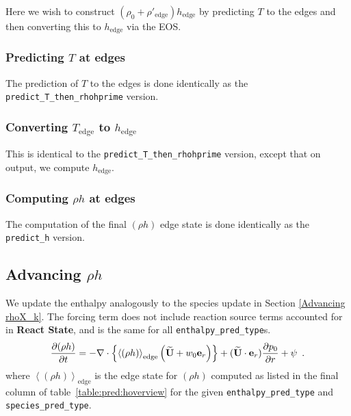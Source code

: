 Here we wish to construct $\left (\rho_0 + \rho'_\mathrm{edge} \right
) h_\mathrm{edge}$ by predicting $T$ to the edges and then converting
this to $h_\mathrm{edge}$ via the EOS.

\subsubsection{Predicting $T$ at edges}

The prediction of $T$ to the edges is done identically as the
{\tt predict\_T\_then\_rhohprime} version.


\subsubsection{Converting $T_\mathrm{edge}$ to $h_\mathrm{edge}$}

This is identical to the {\tt predict\_T\_then\_rhohprime} version,
except that on output, we compute $h_\mathrm{edge}$.

\subsubsection{Computing $\rho h$ at edges}

The computation of the final $(\rho h)$ edge state is done identically
as the {\tt predict\_h} version.



\subsection{Advancing $\rho h$}
We update the enthalpy analogously to the species update in 
Section \ref{Advancing rhoX_k}.  The forcing term does not include reaction
source terms accounted for in {\bf React State}, and is the same
for all {\tt enthalpy\_pred\_type}s.
\begin{equation}
\frac{\partial(\rho h)}{\partial t} = 
-\nabla\cdot\left\{\left \langle (\rho h) \right \rangle_\mathrm{edge}
 \left(\widetilde{{\bf U}} + w_0{\bf e}_r\right)\right\} + (\widetilde{{\bf U}} \cdot \mathbf{e}_r)\frac{\partial p_0}{\partial r} + \psi  \enskip .
\end{equation}
where $\left \langle (\rho h) \right \rangle_\mathrm{edge}$ is the
edge state for $(\rho h)$ computed as listed in the final column of
table~\ref{table:pred:hoverview} for the given {\tt enthalpy\_pred\_type}
and {\tt species\_pred\_type}.




